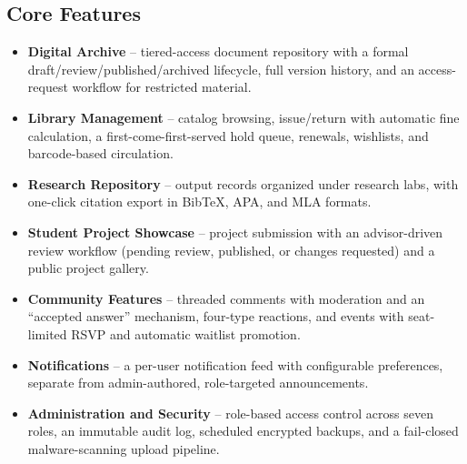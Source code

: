 \documentclass[12pt]{article}
\begin{document}
\subsection{Core Features}
\begin{itemize}[leftmargin=1.4em]
\item \textbf{Digital Archive} -- tiered-access document repository with a formal draft/review/published/archived lifecycle, full version history, and an access-request workflow for restricted material.
\item \textbf{Library Management} -- catalog browsing, issue/return with automatic fine calculation, a first-come-first-served hold queue, renewals, wishlists, and barcode-based circulation.
\item \textbf{Research Repository} -- output records organized under research labs, with one-click citation export in BibTeX, APA, and MLA formats.
\item \textbf{Student Project Showcase} -- project submission with an advisor-driven review workflow (pending review, published, or changes requested) and a public project gallery.
\item \textbf{Community Features} -- threaded comments with moderation and an ``accepted answer'' mechanism, four-type reactions, and events with seat-limited RSVP and automatic waitlist promotion.
\item \textbf{Notifications} -- a per-user notification feed with configurable preferences, separate from admin-authored, role-targeted announcements.
\item \textbf{Administration and Security} -- role-based access control across seven roles, an immutable audit log, scheduled encrypted backups, and a fail-closed malware-scanning upload pipeline.
\end{itemize}
\end{document}
